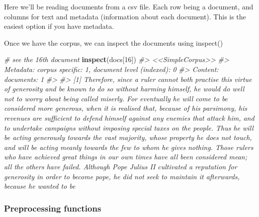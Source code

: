 \documentclass[]{book}
\newenvironment{Shaded}{\begin{snugshade}}{\end{snugshade}}
\newcommand{\CommentTok}[1]{\textcolor[rgb]{0.56,0.35,0.01}{\textit{#1}}}
\newcommand{\DataTypeTok}[1]{\textcolor[rgb]{0.13,0.29,0.53}{#1}}
\newcommand{\DecValTok}[1]{\textcolor[rgb]{0.00,0.00,0.81}{#1}}
\newcommand{\KeywordTok}[1]{\textcolor[rgb]{0.13,0.29,0.53}{\textbf{#1}}}
\newcommand{\NormalTok}[1]{#1}
\newcommand{\OperatorTok}[1]{\textcolor[rgb]{0.81,0.36,0.00}{\textbf{#1}}}
\newcommand{\OtherTok}[1]{\textcolor[rgb]{0.56,0.35,0.01}{#1}}
\newcommand{\StringTok}[1]{\textcolor[rgb]{0.31,0.60,0.02}{#1}}
\begin{document}
Here we'll be reading documents from a csv file. Each row being a document, and columns for text and metadata (information about each document). This is the easiest option if you have metadata.

\begin{Shaded}
\end{Shaded}

Once we have the corpus, we can inspect the documents using inspect()

\begin{Shaded}
\begin{Highlighting}[]
\CommentTok{# see the 16th document}
\KeywordTok{inspect}\NormalTok{(docs[}\DecValTok{16}\NormalTok{])}
\CommentTok{#> <<SimpleCorpus>>}
\CommentTok{#> Metadata:  corpus specific: 1, document level (indexed): 0}
\CommentTok{#> Content:  documents: 1}
\CommentTok{#> }
\CommentTok{#> [1]  Therefore, since a ruler cannot both practise this virtue of generosity and be known to do so without harming himself, he would do well not to worry about being called miserly. For eventually he will come to be considered more generous, when it is realised that, because of his parsimony, his revenues are sufficient to defend himself against any enemies that attack him, and to undertake campaigns without imposing special taxes on the people. Thus he will be acting generously towards the vast majority, whose property he does not touch, and will be acting meanly towards the few to whom he gives nothing.  Those rulers who have achieved great things in our own times have all been considered mean; all the others have failed. Although Pope Julius II cultivated a reputation for generosity in order to become pope, he did not seek to maintain it afterwards, because he wanted to be}
\end{Highlighting}
\end{Shaded}

\hypertarget{preprocessing-functions}{%
\subsubsection*{Preprocessing functions}\label{preprocessing-functions}}
\end{document}
